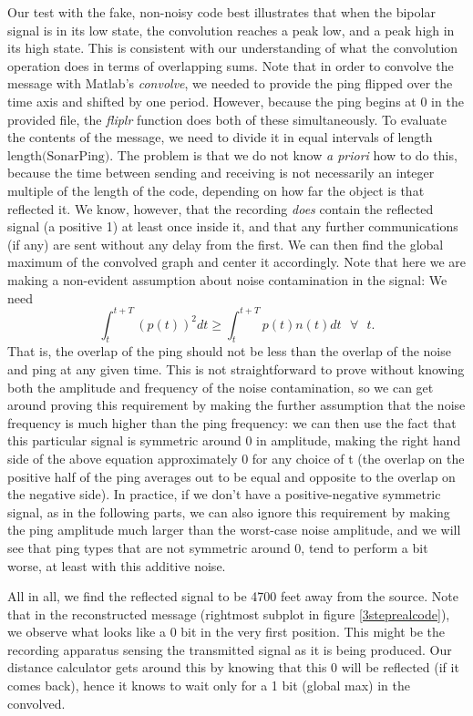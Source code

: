 \documentclass{article}
\begin{document}
	Our test with the fake, non-noisy code best illustrates that when the bipolar signal is in its low state, the convolution reaches a peak low, and a peak high in its high state. This is consistent with our understanding of what the convolution operation does in terms of overlapping sums.
	Note that in order to convolve the message with Matlab's \emph{convolve}, we needed to provide the ping flipped over the time axis and shifted by one period. However, because the ping begins at 0 in the provided file, the \emph{fliplr} function does both of these simultaneously.
	To evaluate the contents of the message, we need to divide it in equal intervals of length $\text{length(SonarPing)}$.
	The problem is that we do not know \emph{a priori} how to do this, because the time between sending and receiving is not necessarily an integer multiple of the length of the code, depending on how far the object is that reflected it.
	We know, however, that the recording \emph{does} contain the reflected signal (a positive 1) at least once inside it, and that any further communications (if any) are sent without any delay from the first. We can then find the global maximum of the convolved graph and center it accordingly.
	Note that here we are making a non-evident assumption about noise contamination in the signal: We need
	\[
	\int_{t}^{t+T}(p(t))^2dt \geq \int_{t}^{t+T}p(t)n(t)dt \text{  } \forall \text{  } t
	.\] 
That is, the overlap of the ping should not be less than the overlap of the noise and ping at any given time.
This is not straightforward to prove without knowing both the amplitude and frequency of the noise contamination, so we can get around proving this requirement by making the further assumption that the noise frequency is much higher than the ping frequency:
we can then use the fact that this particular signal is symmetric around 0 in amplitude, making the right hand side of the above equation approximately 0 for any choice of t 
(the overlap on the positive half of the ping averages out to be equal and opposite to the overlap on the negative side).
In practice, if we don't have a positive-negative symmetric signal, as in the following parts, we can also ignore this requirement by making the ping amplitude much larger than the worst-case noise amplitude, and we will see that ping types that are not symmetric around 0, tend to perform a bit worse, at least with this additive noise.

All in all, we find the reflected signal to be 4700 feet away from the source. Note that in the reconstructed message (rightmost subplot in figure \ref{3steprealcode}), we observe what looks like a 0 bit in the very first position. This might be the recording apparatus sensing the transmitted signal as it is being produced. Our distance calculator gets around this by knowing that this 0 will be reflected (if it comes back), hence it knows to wait only for a 1 bit (global max) in the convolved.
\end{document}
